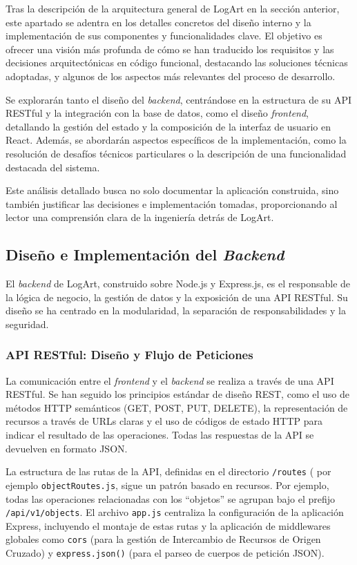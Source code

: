 Tras la descripción de la arquitectura general de LogArt en la sección anterior, este apartado se adentra en los detalles concretos del diseño interno y la implementación de sus componentes y funcionalidades clave. El objetivo es ofrecer una visión más profunda de cómo se han traducido los requisitos y las decisiones arquitectónicas en código funcional, destacando las soluciones técnicas adoptadas, y algunos de los aspectos más relevantes del proceso de desarrollo.

Se explorarán tanto el diseño del \textit{backend}, centrándose en la estructura de su API RESTful y la integración con la base de datos, como el diseño \textit{frontend}, detallando la gestión del estado y la composición de la interfaz de usuario en React. Además, se abordarán aspectos específicos de la implementación, como la resolución de desafíos técnicos particulares o la descripción de una funcionalidad destacada del sistema. 

Este análisis detallado busca no solo documentar la aplicación construida, sino también justificar las decisiones e implementación tomadas, proporcionando al lector una comprensión clara de la ingeniería detrás de LogArt.

\subsection{Diseño e Implementación del \textit{Backend}}
\label{ssec:disenoImplBackend}

El \textit{backend} de LogArt, construido sobre Node.js y Express.js, es el responsable de la lógica de negocio, la gestión de datos y la exposición de una API RESTful. Su diseño se ha centrado en la modularidad, la separación de responsabilidades y la seguridad.

\subsubsection{API RESTful: Diseño y Flujo de Peticiones}
\label{sssec:apiRestfulDiseno}

La comunicación entre el \textit{frontend} y el \textit{backend} se realiza a través de una API RESTful. Se han seguido los principios estándar de diseño REST, como el uso de métodos HTTP semánticos (GET, POST, PUT, DELETE), la representación de recursos a través de URLs claras y el uso de códigos de estado HTTP para indicar el resultado de las operaciones. Todas las respuestas de la API se devuelven en formato JSON.

La estructura de las rutas de la API, definidas en el directorio \texttt{/routes} ( por ejemplo \texttt{objectRoutes.js}, sigue un patrón basado en recursos. Por ejemplo, todas las operaciones relacionadas con los ``objetos'' se agrupan bajo el prefijo \texttt{/api/v1/objects}. El archivo \texttt{app.js} centraliza la configuración de la aplicación Express, incluyendo el montaje de estas rutas y la aplicación de middlewares globales como \texttt{cors} (para la gestión de Intercambio de Recursos de Origen Cruzado) y \texttt{express.json()} (para el parseo de cuerpos de petición JSON).

